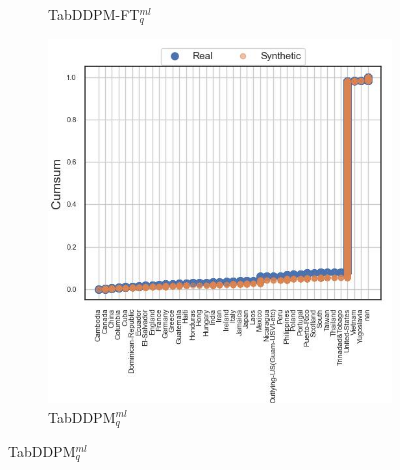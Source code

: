 \begin{figure}[H]
\begin{subfigure}{0.3\textwidth}
		\caption{TabDDPM-FT$^{ml}_q$}
	\end{subfigure}
	\begin{subfigure}{0.3\textwidth}
		\centering
		\includegraphics[width=\textwidth]{images/cdf/tab-ddpm.jpg}
		\caption{TabDDPM$^{ml}_q$}
	\end{subfigure}



\end{figure}
